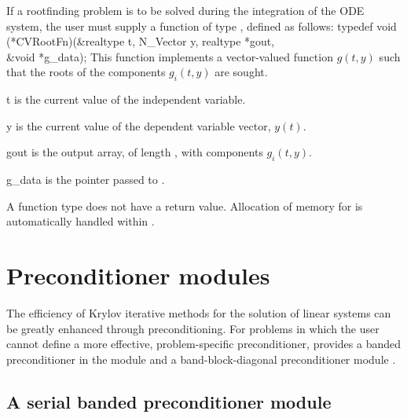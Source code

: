 If a rootfinding problem is to be solved during the integration of the ODE system,
the user must supply a {\C} function of type , defined as follows:
{
  typedef void (*CVRootFn)(&realtype t, N\_Vector y, realtype *gout, \\
                           &void *g\_data);
}
{
  This function implements a vector-valued function $g(t,y)$ such that the roots of 
  the  components $g_i(t,y)$ are sought.
}
{
  \begin{args}[g\_data]
  \item[t]
    is the current value of the independent variable.
  \item[y]
    is the current value of the dependent variable vector, $y(t)$.
  \item[gout]
    is the output array, of length , with components $g_i(t,y)$.
  \item[g\_data]
    is the       
    pointer passed to .   
  \end{args}
}
{
  A  function type does not have a return value.                        
}
{
  Allocation of memory for  is automatically handled within {\cvodes}.
}

\section{Preconditioner modules}\label{ss:preconds}

The efficiency of Krylov iterative methods for the solution of linear systems 
can be greatly enhanced through preconditioning. For problems in which the 
user cannot define a more effective, problem-specific preconditioner,
{\cvodes} provides a banded preconditioner in the module {\cvbandpre} and
a band-block-diagonal preconditioner module {\cvbbdpre}.

\subsection{A serial banded preconditioner module}\label{sss:cvbandpre}



